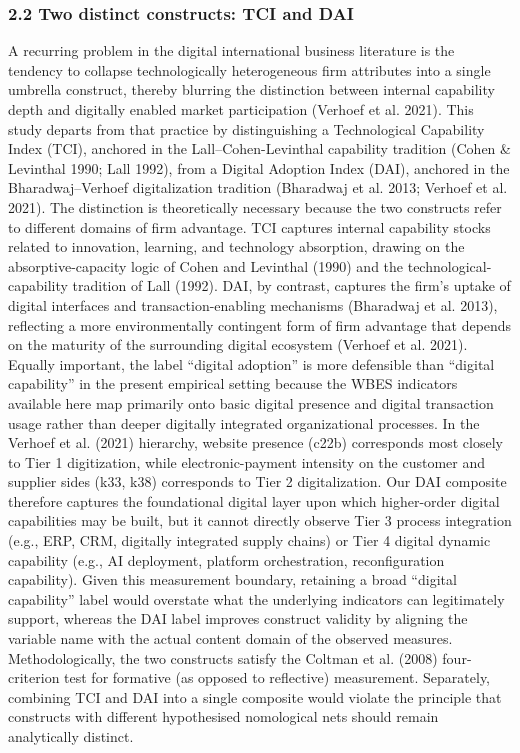 \documentclass[12pt,a4paper]{article}
\begin{document}
\hypertarget{22-two-distinct-constructs-tci-and-dai}{%
\subsubsection{2.2 Two distinct constructs: TCI and
DAI}\label{22-two-distinct-constructs-tci-and-dai}}

A recurring problem in the digital international business literature is
the tendency to collapse technologically heterogeneous firm attributes
into a single umbrella construct, thereby blurring the distinction
between internal capability depth and digitally enabled market
participation (Verhoef et al. 2021). This study departs from that
practice by distinguishing a Technological Capability Index (TCI),
anchored in the Lall--Cohen-Levinthal capability tradition (Cohen \&
Levinthal 1990; Lall 1992), from a Digital Adoption Index (DAI),
anchored in the Bharadwaj--Verhoef digitalization tradition (Bharadwaj
et al. 2013; Verhoef et al. 2021). The distinction is theoretically
necessary because the two constructs refer to different domains of firm
advantage. TCI captures internal capability stocks related to
innovation, learning, and technology absorption, drawing on the
absorptive-capacity logic of Cohen and Levinthal (1990) and the
technological-capability tradition of Lall (1992). DAI, by contrast,
captures the firm's uptake of digital interfaces and
transaction-enabling mechanisms (Bharadwaj et al. 2013), reflecting a
more environmentally contingent form of firm advantage that depends on
the maturity of the surrounding digital ecosystem (Verhoef et al. 2021).
Equally important, the label ``digital adoption'' is more defensible
than ``digital capability'' in the present empirical setting because the
WBES indicators available here map primarily onto basic digital presence
and digital transaction usage rather than deeper digitally integrated
organizational processes. In the Verhoef et al. (2021) hierarchy,
website presence (c22b) corresponds most closely to Tier 1 digitization,
while electronic-payment intensity on the customer and supplier sides
(k33, k38) corresponds to Tier 2 digitalization. Our DAI composite
therefore captures the foundational digital layer upon which
higher-order digital capabilities may be built, but it cannot directly
observe Tier 3 process integration (e.g., ERP, CRM, digitally integrated
supply chains) or Tier 4 digital dynamic capability (e.g., AI
deployment, platform orchestration, reconfiguration capability). Given
this measurement boundary, retaining a broad ``digital capability''
label would overstate what the underlying indicators can legitimately
support, whereas the DAI label improves construct validity by aligning
the variable name with the actual content domain of the observed
measures. Methodologically, the two constructs satisfy the Coltman et
al. (2008) four-criterion test for formative (as opposed to reflective)
measurement. Separately, combining TCI and DAI into a single composite
would violate the principle that constructs with different hypothesised
nomological nets should remain analytically distinct.
\end{document}
